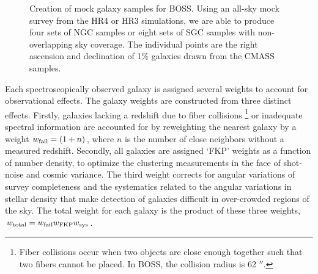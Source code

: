 \documentclass[iop]{emulateapj}
\begin{document}
\begin{figure}
   \caption{\label{fig_mock}
      Creation of mock galaxy samples for BOSS.
      Using an all-sky mock survey from the HR4 or HR3 simulations,
       we are able to produce four sets of NGC samples or eight sets of SGC samples with non-overlapping sky coverage.
      The individual points are the right ascension and declination of 1\% galaxies drawn from the CMASS samples.
      }
\end{figure}

Each spectroscopically observed galaxy is assigned several weights to account for observational effects. 
The galaxy weights are constructed from three distinct effects.
Firstly, galaxies lacking a redshift due to fiber collisions 
\footnote{Fiber collisions occur when two objects are close enough together such that two fibers cannot be placed.
In BOSS, the collision radius is 62 $''$.}
or inadequate spectral information are accounted for by reweighting
the nearest galaxy by a weight $w_{\rm fail}=(1+n)$, 
where $n$ is the number of close neighbors without a measured redshift. 
Secondly, all galaxies are assigned `FKP' weights \citep{1994ApJ...426...23F}
as a function of number density,
to optimize the clustering measurements in the face of shot-noise and cosmic variance.
The third weight corrects for angular variations of survey completeness and the systematics 
related to the angular variations in stellar density that make detection of
galaxies difficult in over-crowded regions of the sky. %
The total weight for each galaxy is the product of these three weights, $w_{\rm total}=w_{\rm fail}w_{\rm FKP}w_{\rm sys}$. 
\end{document}
